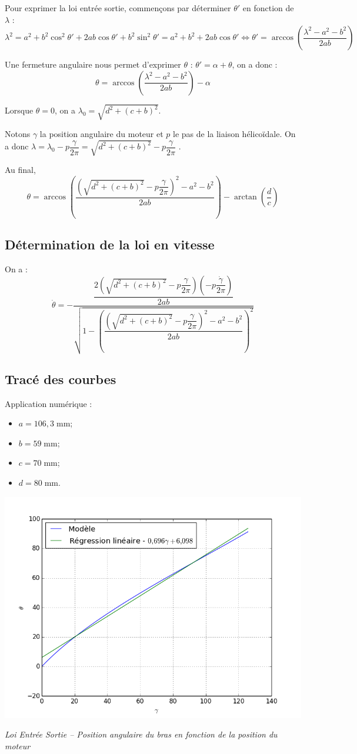 \documentclass[10pt,fleqn]{article} %
\begin{document}
Pour exprimer la loi entrée sortie, commençons par déterminer $\theta'$ en fonction de $\lambda$ : 
$$
\lambda^2 
=  a^2 +b^2\cos^2\theta' + 2ab\cos\theta'  + b^2\sin^2 \theta'
=  a^2 +b^2 + 2ab\cos\theta' 
\Longleftrightarrow 
\theta' = \arccos \left(\dfrac{\lambda^2 - a^2 - b^2 }{2ab} \right)
$$

Une fermeture angulaire nous permet d'exprimer $\theta$ : $\theta' = \alpha + \theta$, on a donc :
$$
\theta = \arccos \left(\dfrac{\lambda^2 - a^2 - b^2 }{2ab} \right) - \alpha
$$

Lorsque $\theta=0$, on a $\lambda_0 = \sqrt{d^2 + (c+b)^2}$.


Notons $\gamma$ la position angulaire du moteur et $p$ le pas de la liaison hélicoïdale. On a donc $\lambda = \lambda_0 - p \dfrac{\gamma}{2\pi}=\sqrt{d^2 + (c+b)^2} - p \dfrac{\gamma}{2\pi}$ .

Au final, 
$$
\theta = \arccos \left(\dfrac{\left( \sqrt{d^2 + (c+b)^2} - p \dfrac{\gamma}{2\pi}\right)^2 - a^2 - b^2 }{2ab} \right) - \arctan\left( \dfrac{d}{c}\right)
$$

\subsection{Détermination de la loi en vitesse}

On a :
$$
\dot{\theta} = -\dfrac{\dfrac{2\left( \sqrt{d^2 + (c+b)^2} - p \dfrac{\gamma}{2\pi}\right) \left( - p \dfrac{\dot{\gamma}}{2\pi}\right)  }{2ab} }{\sqrt{1-\left(\dfrac{\left( \sqrt{d^2 + (c+b)^2} - p \dfrac{\gamma}{2\pi}\right)^2 - a^2 - b^2 }{2ab} \right)^2}}
$$

\subsection{Tracé des courbes} 
Application numérique : 
\begin{itemize}
\item $a = 106,3\; \text{mm}$;
\item $b = 59 \; \text{mm}$;
\item $c = 70 \; \text{mm}$;
\item $d = 80 \; \text{mm}$.
\end{itemize}

\begin{center}
\includegraphics[width=.45\textwidth]{images/LoiTheorique}

\textit{Loi Entrée Sortie -- Position angulaire du bras en fonction de la position du moteur} 
\end{center}
\end{document}
